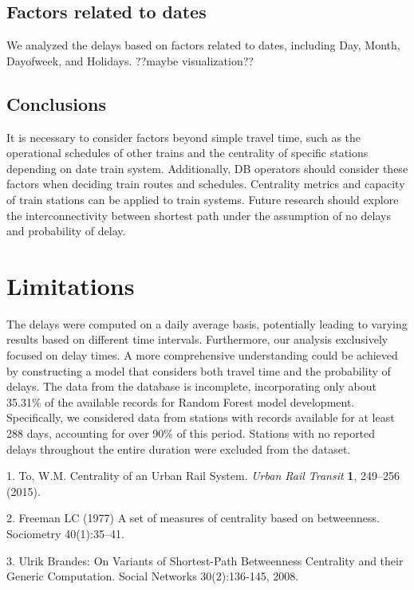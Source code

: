 \documentclass{article}
\theoremstyle{plain}
\theoremstyle{definition}
\theoremstyle{remark}
\begin{document}
\subsection{{Factors related to dates}}

We analyzed the delays based on factors related to dates, including Day, Month, Dayofweek, and Holidays.
??maybe visualization??

\subsection{{Conclusions}}

It is necessary to consider factors beyond simple travel time, such as the operational schedules of other trains and the centrality of specific stations depending on date train system. Additionally, DB operators should consider these factors when deciding train routes and schedules. Centrality metrics and capacity of train stations can be applied to train systems. Future research should explore the interconnectivity between shortest path under the assumption of no delays and probability of delay. 




\section{Limitations}


The delays were computed on a daily average basis, potentially leading to varying results based on different time intervals. Furthermore, our analysis exclusively focused on delay times. A more comprehensive understanding could be achieved by constructing a model that considers both travel time and the probability of delays. The data from the database is incomplete, incorporating only about 35.31\% of the available records for Random Forest model development. Specifically, we considered data from stations with records available for at least 288 days, accounting for over 90\% of this period. Stations with no reported delays throughout the entire duration were excluded from the dataset. 


1. To, W.M. Centrality of an Urban Rail System. \textit{Urban Rail Transit} \textbf{1}, 249–256 (2015).

2. Freeman LC (1977) A set of measures of centrality based on betweenness. Sociometry 40(1):35–41.

3. Ulrik Brandes: On Variants of Shortest-Path Betweenness Centrality and their Generic Computation. Social Networks 30(2):136-145, 2008.

\end{document}
